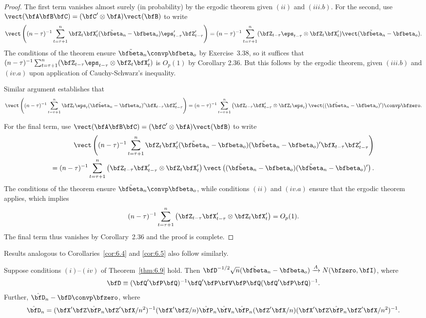 \begin{proof}
The first term vanishes almost surely (in probability) by the ergodic theorem given $(ii)$ and $(iii.b)$. For the second, use $\vect(\bfA\bfB\bfC) = (\bfC'\otimes\bfA)\vect(\bfB)$ to write
\[
  \vect\left((n-\tau)^{-1}\sum_{t=\tau+1}^{n}\bfZ_t\bfX_t'(\tilde{\bfbeta}_n - \bfbeta_o)\eps_{t-\tau}'\bfZ_{t-\tau}'\right)
  = (n-\tau)^{-1}\sum_{t=\tau+1}^{n}(\bfZ_{t-\tau}\eps_{t-\tau}\otimes\bfZ_t\bfX_t')\vect(\tilde{\bfbeta}_n - \bfbeta_o).
\]
The conditions of the theorem ensure $\tilde{\bfbeta}_n \convp \bfbeta_o$ by Exercise~3.38, so it suffices that $(n-\tau)^{-1}\sum_{t=\tau+1}^{n}(\bfZ_{t-\tau}\eps_{t-\tau}\otimes\bfZ_t\bfX_t')$ is $O_p(1)$ by Corollary 2.36. But this follows by the ergodic theorem, given $(iii.b)$ and $(iv.a)$ upon application of Cauchy-Schwarz's inequality.

Similar argument establishes that
\[
  \vect\left((n-\tau)^{-1}\sum_{t=\tau+1}^{n}\bfZ_t\eps_t(\tilde{\bfbeta}_n - \bfbeta_o)'\bfX_{t-\tau}\bfZ_{t-\tau}'\right)
  = (n-\tau)^{-1}\sum_{t=\tau+1}^{n}\left(\bfZ_{t-\tau}\bfX_{t-\tau}'\otimes\bfZ_t\eps_t\right)\vect((\tilde{\bfbeta}_n - \bfbeta_o)') \convp \bfzero.
\]

For the final term, use $\vect(\bfA\bfB\bfC) = (\bfC'\otimes\bfA)\vect(\bfB)$ to write
\begin{align*}
  \vect\left((n-\tau)^{-1}\sum_{t=\tau+1}^{n}\bfZ_t\bfX_t'(\tilde{\bfbeta}_n - \bfbeta_o)(\tilde{\bfbeta}_n - \bfbeta_o)'\bfX_{t-\tau}\bfZ_{t-\tau}'\right) \\
  = (n-\tau)^{-1}\sum_{t=\tau+1}^{n}\left(\bfZ_{t-\tau}\bfX_{t-\tau}'\otimes\bfZ_t\bfX_t'\right)\vect\left((\tilde{\bfbeta}_n - \bfbeta_o)(\tilde{\bfbeta}_n - \bfbeta_o)'\right).
\end{align*}
The conditions of the theorem ensure $\tilde{\bfbeta}_n \convp \bfbeta_o$, while conditions $(ii)$ and $(iv.a)$ ensure that the ergodic theorem applies, which implies
\[
  (n-\tau)^{-1}\sum_{t=\tau+1}^{n}\left(\bfZ_{t-\tau}\bfX_{t-\tau}'\otimes\bfZ_t\bfX_t'\right) = O_p(1).
\]
The final term thus vanishes by Corollary~2.36 and the proof is complete.
\end{proof}

Results analogous to Corollaries~\ref{cor:6.4} and \ref{cor:6.5} also follow similarly.

\begin{corollary}\label{cor:6.10}
Suppose conditions $(i)$--$(iv)$ of Theorem~\ref{thm:6.9} hold. Then $\bfD^{-1/2}\sqrt{n}(\tilde{\bfbeta}_n - \bfbeta_o) \xrightarrow{A} N(\bfzero,\bfI)$, where
\[
  \bfD \equiv (\bfQ'\bfP\bfQ)^{-1}\bfQ'\bfP\bfV\bfP\bfQ(\bfQ'\bfP\bfQ)^{-1}.
\]
Further, $\hat{\bfD}_n - \bfD \convp \bfzero$, where
\[
  \hat{\bfD}_n = (\bfX'\bfZ\hat{\bfP}_n\bfZ'\bfX/n^2)^{-1}(\bfX'\bfZ/n)\hat{\bfP}_n\hat{\bfV}_n\hat{\bfP}_n(\bfZ'\bfX/n)(\bfX'\bfZ\hat{\bfP}_n\bfZ'\bfX/n^2)^{-1}.
\]
\end{corollary}


